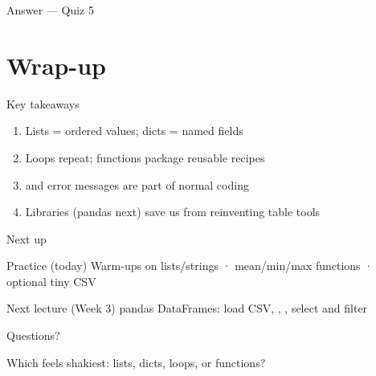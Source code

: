 \documentclass[aspectratio=169,11pt]{beamer}
\begin{document}
    \begin{frame}{Answer --- Quiz 5}
    \end{frame}

    \section{Wrap-up}

    \begin{frame}{Key takeaways}
        \begin{enumerate}
            \item Lists = ordered values; dicts = named fields
            \item Loops repeat; functions package reusable recipes
            \item {} and error messages are part of normal coding
            \item Libraries (pandas next) save us from reinventing table tools
        \end{enumerate}
    \end{frame}

    \begin{frame}{Next up}
        \begin{block}{Practice (today)}
            Warm-ups on lists/strings · mean/min/max functions · optional tiny CSV
        \end{block}
        \vspace{0.5em}
        \begin{block}{Next lecture (Week 3)}
            pandas DataFrames: load CSV, , , select and filter
        \end{block}
    \end{frame}

    \begin{frame}{Questions?}
        \begin{center}
            {\Large Which feels shakiest: lists, dicts, loops, or functions?}
        \end{center}
    \end{frame}
\end{document}
